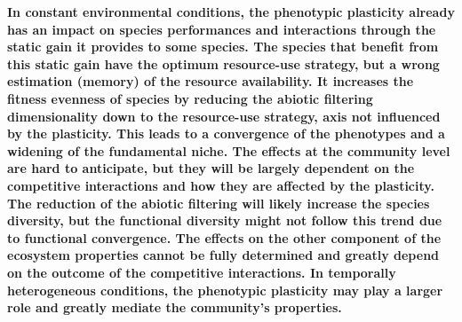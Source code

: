 \begin{figure}\label{fig:rain_pl_effect}
    \classiccaptionstyle
{}
\end{figure}

\textbf{In constant environmental conditions, the phenotypic plasticity already has an impact on species performances and interactions through the static gain it provides to some species. The species that benefit from this static gain have the optimum resource-use strategy, but a wrong estimation (memory) of the resource availability. It increases the fitness evenness of species by reducing the abiotic filtering dimensionality down to the resource-use strategy, axis not influenced by the plasticity. This leads to a convergence of the phenotypes and a widening of the fundamental niche. The effects at the community level are hard to anticipate, but they will be largely dependent on the competitive interactions and how they are affected by the plasticity. The reduction of the abiotic filtering will likely increase the species diversity, but the functional diversity might not follow this trend due to functional convergence. The effects on the other component of the ecosystem properties cannot be fully determined and greatly depend on the outcome of the competitive interactions. In temporally heterogeneous conditions, the phenotypic plasticity may play a larger role and greatly mediate the community's properties.}


